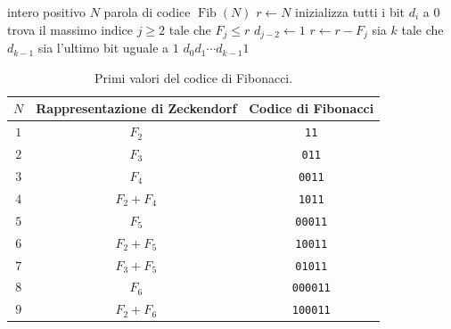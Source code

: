 \documentclass{article}
\theoremstyle{definition}
\numberwithin{equation}{section}
\begin{document}
\begin{algorithm}[htpb]
    \caption{Codifica di Fibonacci di un intero positivo}
    \label{alg:fibonacci_encoding}
    \begin{algorithmic}[1]
        \Require intero positivo $N$
        \Ensure parola di codice $\operatorname{Fib}(N)$
        \State $r \gets N$
        \State inizializza tutti i bit $d_i$ a $0$
        \State trova il massimo indice $j\geq 2$ tale che $F_j\leq r$
        \State $d_{j-2}\gets 1$
        \State $r\gets r-F_j$
        \EndWhile
        \State sia $k$ tale che $d_{k-1}$ sia l'ultimo bit uguale a $1$
        \State \Return $d_0d_1\cdots d_{k-1}1$
    \end{algorithmic}
\end{algorithm}

\begin{table}[htpb]
    \centering
    \small
    \begin{tabular}{|c|c|c|}
        \hline
        \textbf{$N$} & \textbf{Rappresentazione di Zeckendorf} & \textbf{Codice di Fibonacci} \\ \hline
        $1$          & $F_2$                                   & \texttt{11}                  \\ \hline
        $2$          & $F_3$                                   & \texttt{011}                 \\ \hline
        $3$          & $F_4$                                   & \texttt{0011}                \\ \hline
        $4$          & $F_2+F_4$                               & \texttt{1011}                \\ \hline
        $5$          & $F_5$                                   & \texttt{00011}               \\ \hline
        $6$          & $F_2+F_5$                               & \texttt{10011}               \\ \hline
        $7$          & $F_3+F_5$                               & \texttt{01011}               \\ \hline
        $8$          & $F_6$                                   & \texttt{000011}              \\ \hline
        $9$          & $F_2+F_6$                               & \texttt{100011}              \\ \hline
    \end{tabular}
    \caption{Primi valori del codice di Fibonacci.}
    \label{tab:fibonacci_codewords}
\end{table}
\end{document}
